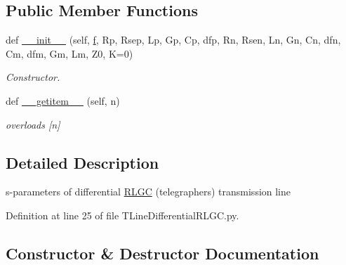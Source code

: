 \subsection*{Public Member Functions}
\begin{DoxyCompactItemize}
\item 
def \hyperlink{classSignalIntegrity_1_1SParameters_1_1Devices_1_1TLineDifferentialRLGC_1_1TLineDifferentialRLGC_a6e2221dcb3e23f6ba4ffa1c0ecb1a5bd}{\+\_\+\+\_\+init\+\_\+\+\_\+} (self, \hyperlink{classSignalIntegrity_1_1SParameters_1_1SParameters_1_1SParameters_a32e7a34d6837fe949b413c852a0447f8}{f}, Rp, Rsep, Lp, Gp, Cp, dfp, Rn, Rsen, Ln, Gn, Cn, dfn, Cm, dfm, Gm, Lm, Z0, K=0)
\begin{DoxyCompactList}\small\item\em Constructor. \end{DoxyCompactList}\item 
def \hyperlink{classSignalIntegrity_1_1SParameters_1_1Devices_1_1TLineDifferentialRLGC_1_1TLineDifferentialRLGC_ab7a6da5139e0878b590d68292aaa70f2}{\+\_\+\+\_\+getitem\+\_\+\+\_\+} (self, n)
\begin{DoxyCompactList}\small\item\em overloads \mbox{[}n\mbox{]} \end{DoxyCompactList}\end{DoxyCompactItemize}


\subsection{Detailed Description}
s-\/parameters of differential \hyperlink{namespaceSignalIntegrity_1_1SParameters_1_1RLGC}{R\+L\+GC} (telegrapher\textquotesingle{}s) transmission line 

Definition at line 25 of file T\+Line\+Differential\+R\+L\+G\+C.\+py.



\subsection{Constructor \& Destructor Documentation}
\mbox{\label{classSignalIntegrity_1_1SParameters_1_1Devices_1_1TLineDifferentialRLGC_1_1TLineDifferentialRLGC_a6e2221dcb3e23f6ba4ffa1c0ecb1a5bd}} 
